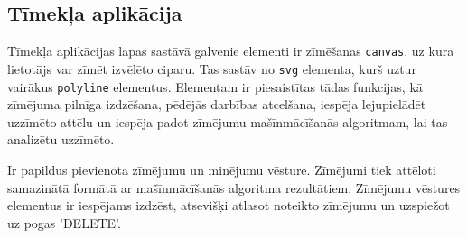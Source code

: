 \subsection{Tīmekļa aplikācija}
Tīmekļa aplikācijas lapas sastāvā galvenie elementi ir zīmēšanas \texttt{canvas}, uz kura lietotājs var zīmēt izvēlēto ciparu. Tas sastāv no \texttt{svg} elementa, kurš uztur vairākus \texttt{polyline} elementus. Elementam ir piesaistītas tādas funkcijas, kā zīmējuma pilnīga izdzēšana, pēdējās darbības atcelšana, iespēja lejupielādēt uzzīmēto attēlu un iespēja padot zīmējumu mašīnmācīšanās algoritmam, lai tas analizētu uzzīmēto.
\par Ir papildus pievienota zīmējumu un minējumu vēsture. Zīmējumi tiek attēloti samazinātā formātā ar mašīnmācīšanās algoritma rezultātiem. Zīmējumu vēstures elementus ir iespējams izdzēst, atsevišķi atlasot noteikto zīmējumu un uzspiežot uz pogas 'DELETE'.



